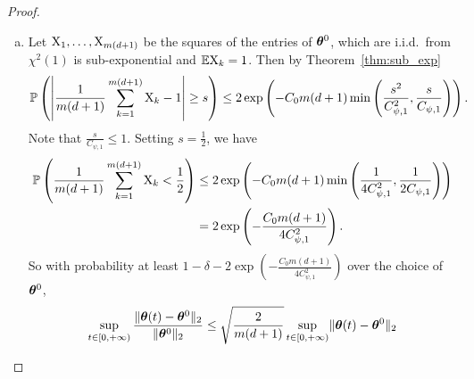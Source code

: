\documentclass{article}
\begin{document}
\begin{proof}
\begin{enumerate}[(a)]
\begin{enumerate}[(i)]
\begin{equation}
                        \end{equation}
                  \item For $t\in[0,t^*)$,
                        \begin{equation}
                            \RS(\vtheta(t))\leq\exp\left(-\frac{m\kappa^2}{n}\left(\frac{1}{\kappa'}\lambda_a+\kappa'\lambda_{\vw}\right)t\right)\RS(\vtheta^0)\leq\exp\left(-\frac{2m\kappa^2\lambda}{n}\right)\RS(\vtheta^0).
                        \end{equation}
                        Suppose that $t^*<+\infty$ then one can take the limit $t\to t^*$ in~\eqref{thm-proof:step1} and~\eqref{thm-proof:step2}. This will lead to a contradiction with the definition of $t^*$. Therefore $t^*=+\infty$.
              \end{enumerate}
        \item Let $\textnormal{X}_1, \ldots, \textnormal{X}_{m(d+1)}$ be the squares of the entries of $\bm{\theta}^0$, which are i.i.d.\ from $\chi^2(1)$ is sub-exponential and $\mathbb{E}\textnormal{X}_k=1$. Then by Theorem~\ref{thm:sub_exp}
              \begin{equation}
                  \mathbb{P}\left(\left\lvert\frac{1}{m(d+1)}\sum_{k=1}^{m(d+1)}\textnormal{X}_k-1\right\rvert\geq s\right)\leq 2\exp\left(-C_0 m(d+1) \min\left(\frac{s^2}{C^2_{\psi,1}},\frac{s}{C_{\psi,1}}\right)\right).
              \end{equation}
              Note that $\frac{s}{C_{\psi,1}}\leq 1$. Setting $s=\frac{1}{2}$, we have
              \begin{equation}
                  \begin{aligned}
                      \mathbb{P}\left(\frac{1}{m(d+1)}\sum_{k=1}^{m(d+1)}\textnormal{X}_k<\frac{1}{2}\right)
                       & \leq 2\exp\left(-C_0 m(d+1) \min\left(\frac{1}{4C^2_{\psi,1}},\frac{1}{2C_{\psi,1}}\right)\right) \\
                       & =2\exp\left(-\frac{C_0m(d+1)}{4C^2_{\psi,1}}\right).
                  \end{aligned}
              \end{equation}
              So with probability at least $1-\delta-2\exp\left(-\frac{C_0m(d+1)}{4C^2_{\psi,1}}\right)$ over the choice of $\bm{\theta}^0$,
              \begin{equation}
                  \begin{aligned}
                      \sup\limits_{t\in[0,+\infty)}\frac{\norm{\vtheta(t)-\vtheta^0}_2}{\norm{\vtheta^0}_2}
                       & \leq \sqrt{\frac{2}{m(d+1)}}\sup\limits_{t\in[0,+\infty)}\norm{\vtheta(t)-\vtheta^0}_2                                          \\

\end{aligned}
\end{equation}
\end{enumerate}
\end{proof}
\end{document}
